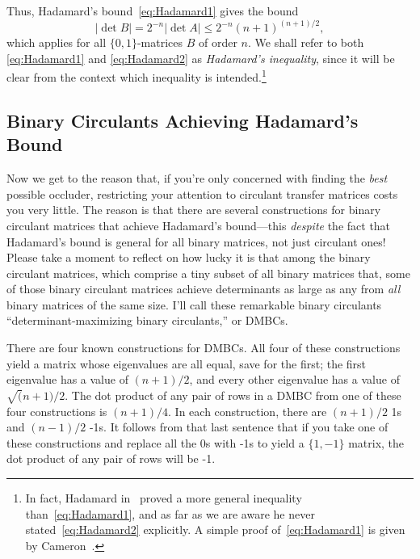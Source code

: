Thus, Hadamard's bound~\eqref{eq:Hadamard1} gives the bound
\begin{equation}
|\det B| = 2^{-n}|\det A| \le 2^{-n}(n+1)^{(n+1)/2},	\label{eq:Hadamard2}
\end{equation}
which applies for all $\{0,1\}$-matrices $B$ of order $n$.
We shall refer to both \eqref{eq:Hadamard1} and \eqref{eq:Hadamard2} as
\emph{Hadamard's inequality}, since it will be clear from the context
which inequality is intended.\footnote{In fact, Hadamard 
in~\cite{Hadamard93} proved a more
general inequality than~\eqref{eq:Hadamard1}, and as far as we are aware he
never stated~\eqref{eq:Hadamard2} explicitly.
A simple proof of~\eqref{eq:Hadamard1} is given by Cameron~\cite{Cameron06}.
}

\subsection{Binary Circulants Achieving Hadamard's Bound}

Now we get to the reason that, if you're only concerned with finding the \emph{best} possible occluder, restricting your attention to circulant transfer matrices costs you very little. The reason is that there are several constructions for binary circulant matrices that achieve Hadamard's bound---this \emph{despite} the fact that Hadamard's bound is general for all binary matrices, not just circulant ones! Please take a moment to reflect on how lucky it is that among the binary circulant matrices, which comprise a tiny subset of all binary matrices that, some of those binary circulant matrices achieve determinants as large as any from \emph{all} binary matrices of the same size. I'll call these remarkable binary circulants ``determinant-maximizing binary circulants,'' or DMBCs.

There are four known constructions for DMBCs. All four of these constructions yield a matrix whose eigenvalues are all equal, save for the first; the first eigenvalue has a value of $(n+1)/2$, and every other eigenvalue has a value of $\sqrt(n+1)/2$. The dot product of any pair of rows in a DMBC from one of these four constructions is $(n+1)/4$. In each construction, there are $(n+1)/2$ 1s and $(n-1)/2$ -1s. It follows from that last sentence that if you take one of these constructions and replace all the 0s with -1s to yield a $\{1, -1\}$ matrix, the dot product of any pair of rows will be -1.

